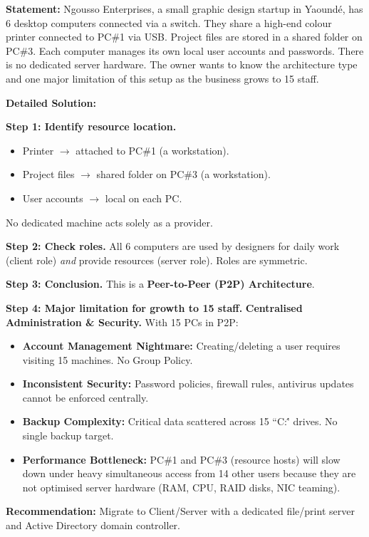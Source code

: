 \documentclass[11pt]{article}
\begin{document}
\begin{exoresolu}
\textbf{Statement:}
Ngousso Enterprises, a small graphic design startup in Yaoundé, has 6 desktop computers connected via a switch. They share a high-end colour printer connected to PC\#1 via USB. Project files are stored in a shared folder on PC\#3. Each computer manages its own local user accounts and passwords. There is no dedicated server hardware. The owner wants to know the architecture type and one major limitation of this setup as the business grows to 15 staff.

\tcblower
\textbf{Detailed Solution:}

\noindent\textbf{Step 1: Identify resource location.}
\begin{itemize}
    \item Printer $\rightarrow$ attached to PC\#1 (a workstation).
    \item Project files $\rightarrow$ shared folder on PC\#3 (a workstation).
    \item User accounts $\rightarrow$ local on each PC.
\end{itemize}
No dedicated machine acts solely as a provider.

\noindent\textbf{Step 2: Check roles.}
All 6 computers are used by designers for daily work (client role) \emph{and} provide resources (server role). Roles are symmetric.

\noindent\textbf{Step 3: Conclusion.}
This is a \textbf{Peer-to-Peer (P2P) Architecture}.

\noindent\textbf{Step 4: Major limitation for growth to 15 staff.}
\textbf{Centralised Administration \& Security.} With 15 PCs in P2P:
\begin{itemize}
    \item \textbf{Account Management Nightmare:} Creating/deleting a user requires visiting 15 machines. No Group Policy.
    \item \textbf{Inconsistent Security:} Password policies, firewall rules, antivirus updates cannot be enforced centrally.
    \item \textbf{Backup Complexity:} Critical data scattered across 15 ``C:\'' drives. No single backup target.
    \item \textbf{Performance Bottleneck:} PC\#1 and PC\#3 (resource hosts) will slow down under heavy simultaneous access from 14 other users because they are not optimised server hardware (RAM, CPU, RAID disks, NIC teaming).
\end{itemize}
\textbf{Recommendation:} Migrate to Client/Server with a dedicated file/print server and Active Directory domain controller.
\end{exoresolu}
\end{document}

